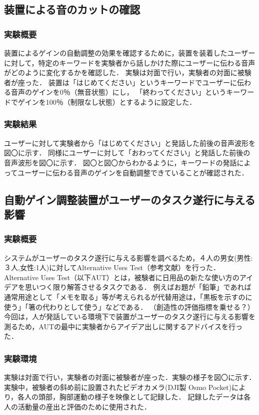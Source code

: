 \documentclass[a4paper]{jarticle}
\begin{document}
\subsection{装置による音のカットの確認}
\subsubsection{実験概要}
装置によるゲインの自動調整の効果を確認するために，装置を装着したユーザーに対して，特定のキーワードを実験者から話しかけた際にユーザーに伝わる音声がどのように変化するかを確認した．
実験は対面で行い，実験者の対面に被験者が座った．
装置は「はじめてください」というキーワードでユーザーに伝わる音声のゲインを0％（無音状態）にし，
「終わってください」というキーワードでゲインを100％（制限なし状態）とするように設定した．

\subsubsection{実験結果}
ユーザーに対して実験者から「はじめてください」と発話した前後の音声波形を図〇に示す．
同様にユーザーに対して「おわってください」と発話した前後の音声波形を図〇に示す．
図〇と図〇からわかるように，キーワードの発話によってユーザーに伝わる音声のゲインを自動調整できていることが確認された．
\subsection{自動ゲイン調整装置がユーザーのタスク遂行に与える影響}
\subsubsection{実験概要}
システムがユーザーのタスク遂行に与える影響を調べるため，４人の男女(男性:３人,女性:1人)に対してAlternative Uses Test（参考文献）を行った．
Alternative Uses Test（以下AUT）とは，被験者に日用品の新たな使い方のアイデアを思いつく限り解答させるタスクである．
例えばお題が「鉛筆」であれば通常用途として「メモを取る」等が考えられるが代替用途は，「黒板を示すのに使う」「箸の代わりとして使う」などである．
（創造性の評価指標を乗せる？）
今回は，人が発話している環境下で装置がユーザーのタスク遂行に与える影響を測るため，AUTの最中に実験者からアイデア出しに関するアドバイスを行った．
\subsubsection{実験環境}
実験は対面で行い，実験者の対面に被験者が座った．実験の様子を図〇に示す．
実験中，被験者の斜め前に設置されたビデオカメラ(DJI製 Osmo Pocket)により，各人の頭部，胸部運動の様子を映像として記録した．
記録したデータは各人の活動量の産出と評価のために使用された．
\end{document}
